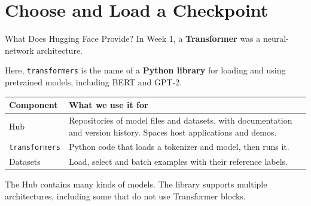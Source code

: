 \documentclass[aspectratio=169]{beamer}
\begin{document}
\section{Choose and Load a Checkpoint}
\begin{frame}{What Does Hugging Face Provide?}
  \small In Week 1, a \textbf{Transformer} was a neural-network architecture.
  \par\vspace{0.4em}
  Here, \texttt{transformers} is the name of a \textbf{Python library} for loading and using pretrained models, including BERT and GPT-2.
  \par\vspace{0.6em}
  \small\renewcommand{\arraystretch}{1.3}
  \begin{tabular}{@{}p{3.2cm}p{9.0cm}@{}}
    \toprule
    \textbf{Component} & \textbf{What we use it for} \\
    \midrule
    Hub & Repositories of model files and datasets, with documentation and version history. Spaces host applications and demos. \\
    \texttt{transformers} & Python code that loads a tokenizer and model, then runs it. \\
    Datasets & Load, select and batch examples with their reference labels. \\
    \bottomrule
  \end{tabular}\par
  \vspace{0.6em}
  The Hub contains many kinds of models. The library supports multiple architectures, including some that do not use Transformer blocks.
\end{frame}
\end{document}
